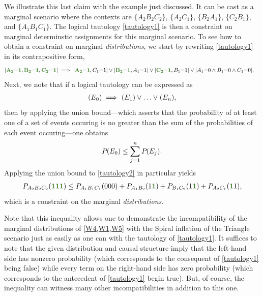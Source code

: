 \documentclass[aps,english,superscriptaddress,onecolumn,twoside,longbibliography,pra,floatfix,fleqn,nofootinbib]{revtex4-1}%
\newcommand*{\mgreen}[1]{{\color{OliveGreen}{\mathbf{#1}}}}
\theoremstyle{definition}
\newcommand{\p}[2][]{{P_{#1}}\parenths{#2}}
\newcommand{\SmallNamedFunction}[3][]{\operatorname{\mathsf{#2}}_{#1}\parenths{#3}}
\newcommand{\cramp}[1]{\ensuremath{\mathord{#1}}}
\newcommand{\eql}{\cramp{=}}
\DeclarePairedDelimiter{\parens}{\lparen}{\rparen}
\DeclarePairedDelimiter{\parenths}{\lparen}{\rparen}
\begin{document}
We illustrate this last claim with the example just discussed.  It can be cast as a marginal scenario where the contexts are $\{A_2 B_2 C_2\}$, $\{A_2 C_1\}$, $\{B_2 A_1\}$, $\{C_2 B_1\}$, and  $\{A_1 B_1 C_1\}$.  The logical tautology \eqref{tautology1} is then a constraint on marginal determinstic  assignments for this marginal scenario.   To see how to obtain a constraint on marginal {\em distributions}, we start by rewriting \cref{tautology1} in its contrapositive form,
\begin{align}\begin{split}\label{tautology2}
&[\mgreen{A_2 \eql 1} , \mgreen{B_2 \eql 1} , \mgreen{C_2 \eql 1}]  \implies [\mgreen{A_2 \eql 1}, C_1 \eql 1] \lor  [\mgreen{B_2 \eql 1}, A_1 \eql 1] \lor  [\mgreen{C_2 \eql 1}, B_1 \eql 1] \lor  [A_1 \eql 0 \land B_1 \eql 0 \land C_1 \eql 0].
\end{split}\end{align}
Next, we note that if a logical tautology can be expressed as
\begin{align}\label{eq:inference}
    \SmallNamedFunction{}{E_0} \implies \SmallNamedFunction{}{E_1} \lor \ldots \lor \SmallNamedFunction{}{E_n},
\end{align}
then by applying the union bound---which asserts that the probability of at least one of a set of events occuring is no greater than the sum of the probabilities of each event occuring---one obtains
\begin{align}\label{eq:possinference}
\p{E_0}\leq \sum\limits_{j=1}^n{\p{E_j}}.
\end{align}
Applying the union bound to \cref{tautology2} in particular yields
\begin{align}\label{eq:F3rawweak}
P_{A_2 B_2 C_2}\parens{\mgreen{1} \mgreen{1} \mgreen{1}} \leq P_{A_1 B_1 C_1}\parens{0 0 0}+P_{A_1 B_2}\parens{1 \mgreen{1 }}+P_{ B_1 C_2}\parens{ 1 \mgreen{1}}+P_{A_2 C_1}\parens{\mgreen{1 } 1},
\end{align}
which is a constraint on the marginal {\em distributions}.
 
Note that this inequality allows one to demonstrate the incompatibility of the marginal distributions of \cref{W4,W1,W5} with the Spiral inflation of the Triangle scenario just as easily as one can with the tautology of \cref{tautology1}.  It suffices to note that the given distribution and causal structure imply that the left-hand side has nonzero probability (which corresponds to the consequent of \cref{tautology1} being false) while every term on the right-hand side has zero probability (which corresponds to the antecedent of  \cref{tautology1} begin true).
But, of course, the inequality can witness many other incompatibilities in addition to this one.
\end{document}
